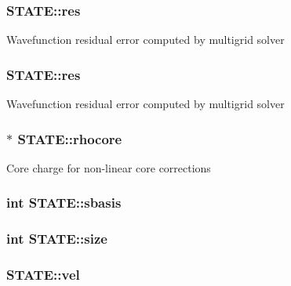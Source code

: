 \hypertarget{struct_s_t_a_t_e_a604d7f132167997ff522685cef18ffbf}{
\subsubsection[{res}]{ S\-T\-A\-T\-E\-::res}}\label{struct_s_t_a_t_e_a604d7f132167997ff522685cef18ffbf}
Wavefunction residual error computed by multigrid solver \hypertarget{struct_s_t_a_t_e_aaa6976a1bf9492a3eebd894f4f080f9e}{
\subsubsection[{res}]{ S\-T\-A\-T\-E\-::res}}\label{struct_s_t_a_t_e_aaa6976a1bf9492a3eebd894f4f080f9e}
Wavefunction residual error computed by multigrid solver \hypertarget{struct_s_t_a_t_e_a08e1c9cbdf5d94c0efb41faa09446cff}{
\subsubsection[{rhocore}]{$\ast$ S\-T\-A\-T\-E\-::rhocore}}\label{struct_s_t_a_t_e_a08e1c9cbdf5d94c0efb41faa09446cff}
Core charge for non-\/linear core corrections \hypertarget{struct_s_t_a_t_e_ab28c5b3ff044d69158ae0b1c2a437fd4}{
\subsubsection[{sbasis}]{\setlength{\rightskip}{0pt plus 5cm}int S\-T\-A\-T\-E\-::sbasis}}\label{struct_s_t_a_t_e_ab28c5b3ff044d69158ae0b1c2a437fd4}
\hypertarget{struct_s_t_a_t_e_ac9df7874309bf9d2cad2b84ec0514905}{
\subsubsection[{size}]{\setlength{\rightskip}{0pt plus 5cm}int S\-T\-A\-T\-E\-::size}}\label{struct_s_t_a_t_e_ac9df7874309bf9d2cad2b84ec0514905}
\hypertarget{struct_s_t_a_t_e_a1bf04d2c6616ef1ccd4bd9ba53363c3c}{
\subsubsection[{vel}]{ S\-T\-A\-T\-E\-::vel}}\label{struct_s_t_a_t_e_a1bf04d2c6616ef1ccd4bd9ba53363c3c}
